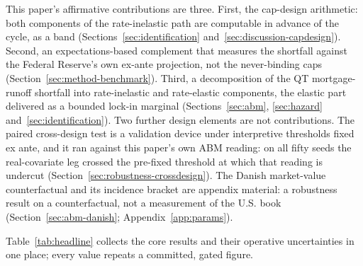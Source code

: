 This paper's affirmative contributions are three. First, the cap-design arithmetic: both components of the rate-inelastic path are computable in advance of the cycle, as a band (Sections~\ref{sec:identification} and~\ref{sec:discussion-capdesign}). Second, an expectations-based complement that measures the shortfall against the Federal Reserve's own ex-ante projection, not the never-binding caps (Section~\ref{sec:method-benchmark}). Third, a decomposition of the QT mortgage-runoff shortfall into rate-inelastic and rate-elastic components, the elastic part delivered as a bounded lock-in marginal (Sections~\ref{sec:abm}, \ref{sec:hazard} and~\ref{sec:identification}). Two further design elements are not contributions. The paired cross-design test is a validation device under interpretive thresholds fixed ex ante, and it ran against this paper's own ABM reading: on all fifty seeds the real-covariate leg crossed the pre-fixed threshold at which that reading is undercut (Section~\ref{sec:robustness-crossdesign}). The Danish market-value counterfactual and its incidence bracket are appendix material: a robustness result on a counterfactual, not a measurement of the U.S. book (Section~\ref{sec:abm-danish}; Appendix~\ref{app:params}).

Table~\ref{tab:headline} collects the core results and their operative uncertainties in one place; every value repeats a committed, gated figure.

